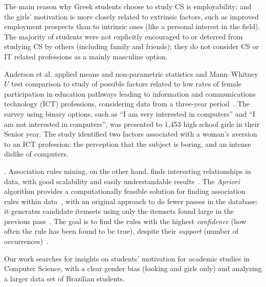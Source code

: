 The main reason why Greek students choose to study CS is employability; and the girls' motivation is more closely related to extrinsic factors, such as improved employment prospects than to intrinsic ones (like a personal interest in the field). The majority of students were not explicitly encouraged to or deterred from studying CS by others (including family and friends); they do not consider CS or IT related professions as a mainly masculine option.

Anderson et al. applied means and non-parametric statistics and Mann–Whitney $U$ test comparison to study of possible factors related to low rates of female participation in education pathways leading to information and communications technology (ICT) professions, considering data from a three-year period~\cite{anderson_because_2008}. The survey using binary options, such as ``I am very interested in computers'' and ``I am not interested in computers'', was presented to 1,453 high school girls in their Senior year. The study identified two factors associated with a woman's aversion to an ICT profession: the perception that the subject is boring, and an intense dislike of computers.

. Association rules mining, on the other hand, finds interesting relationships in data, with good scalability and easily understandable results~\cite{Cios2007}. The \emph{Apriori} algorithm provides a computationally feasible solution for finding association rules within data~\cite{Hastie2009}, with an original approach to do fewer passes in the database: it generates candidate itemsets using only the itemsets found large in the previous pass~\cite{Agrawal1994}. The goal is to find the rules with the highest \emph{confidence} (how often the rule has been found to be true), despite their \emph{support} (number of occurrences)~\cite{taniar_exception_2008}.

Our work searches for insights on students' motivation for academic studies in Computer Science, with a clear gender bias (looking and girls only) and analyzing a larger data set of Brazilian students.
